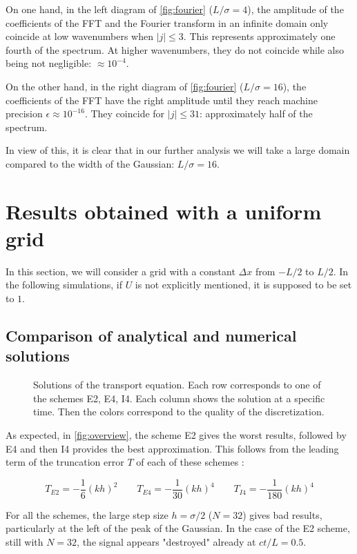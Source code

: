 \documentclass[11 pt]{article}
\begin{document}
On one hand, in the left diagram of \autoref{fig:fourier} ($L / \sigma = 4$), the amplitude of the coefficients of the FFT and the Fourier transform in an infinite domain only coincide at low wavenumbers when $|j| \leq 3$. This represents approximately one fourth of the spectrum. At higher wavenumbers, they do not coincide while also being not negligible: $\approx 10^{-4}$.

On the other hand, in the right diagram of \autoref{fig:fourier} ($L/\sigma = 16$), the coefficients of the FFT have the right amplitude until they reach machine precision $\epsilon \approx 10^{-16}$. They coincide for $|j| \leq 31$: approximately half of the spectrum.

In view of this, it is clear that in our further analysis we will take a large domain compared to the width of the Gaussian: $L / \sigma = 16$.


\section{Results obtained with a uniform grid}
In this section, we will consider a grid with a constant $\Delta x$ from $-L/2$ to $L/2$. In the following simulations, if $U$ is not explicitly mentioned, it is supposed to be set to $1$.

\subsection{Comparison of analytical and numerical solutions}
\vspace{-12pt}
\begin{figure}[H]
    \centering
    
    \caption{Solutions of the transport equation. Each row corresponds to one of the schemes E2, E4, I4. Each column shows the solution at a specific time. Then the colors correspond to the quality of the discretization.}
    \label{fig:overview}
\end{figure}

\vspace{-6pt}
As expected, in \autoref{fig:overview}, the scheme E2 gives the worst results, followed by E4 and then I4 provides the best approximation. This follows from the leading term of the truncation error $T$ of each of these schemes \cite[p. 5]{slides}:

\[T_{E2}=-\frac{1}{6}(kh)^2 \qquad T_{E4} = -\frac{1}{30}(kh)^4 \qquad T_{I4}=-\frac{1}{180}(kh)^4\]

For all the schemes, the large step size $h=\sigma/2$ ($N=32$) gives bad results, particularly at the left of the peak of the Gaussian. In the case of the E2 scheme, still with $N=32$, the signal appears "destroyed" already at $ct/L=0.5$.
\end{document}
